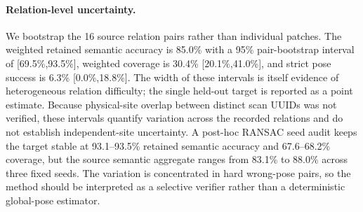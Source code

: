 \documentclass[10pt,twocolumn]{article}
\begin{document}
\paragraph{Relation-level uncertainty.}
We bootstrap the 16 source relation pairs rather than individual patches. The weighted
retained semantic accuracy is 85.0\% with a 95\% pair-bootstrap interval of
[69.5\%,93.5\%], weighted coverage is 30.4\% [20.1\%,41.0\%], and strict
pose success is 6.3\% [0.0\%,18.8\%]. The width of these intervals is itself
evidence of heterogeneous relation difficulty; the single held-out target is
reported as a point estimate. Because physical-site overlap between distinct
scan UUIDs was not verified, these intervals quantify variation across the
recorded relations and do not establish independent-site uncertainty.
A post-hoc RANSAC seed audit keeps the target stable at 93.1--93.5\% retained
semantic accuracy and 67.6--68.2\% coverage, but the source semantic aggregate ranges
from 83.1\% to 88.0\% across three fixed seeds. The variation is concentrated
in hard wrong-pose pairs, so the method should be interpreted as a selective
verifier rather than a deterministic global-pose estimator.
\end{document}
